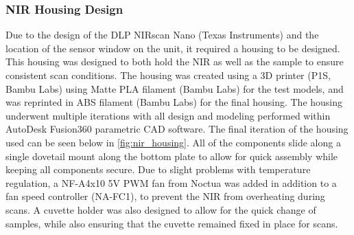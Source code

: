 \documentclass[preprint, 3p, 11pt]{elsarticle}
\begin{document}
\subsubsection{NIR Housing Design}
Due to the design of the DLP NIRscan Nano (Texas Instruments) and the location of the sensor window on the unit, it required a housing to be designed. This housing was designed to both hold the NIR as well as the sample to ensure consistent scan conditions. The housing was created using a 3D printer (P1S, Bambu Labs) using Matte PLA filament (Bambu Labs) for the test models, and was reprinted in ABS filament (Bambu Labs) for the final housing. 
The housing underwent multiple iterations with all design and modeling performed within AutoDesk Fusion360 parametric CAD software. The final iteration of the housing used can be seen below in \autoref{fig:nir_housing}. All of the components slide along a single dovetail mount along the bottom plate to allow for quick assembly while keeping all components secure. Due to slight problems with temperature regulation, a NF-A4x10 5V PWM fan from Noctua was added in addition to a fan speed controller (NA-FC1), to prevent the NIR from overheating during scans. A cuvette holder was also designed to allow for the quick change of samples, while also ensuring that the cuvette remained fixed in place for scans. 
\end{document}
